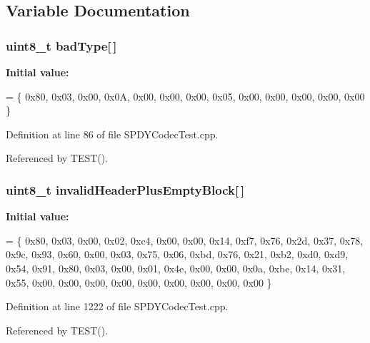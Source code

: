 \subsection{Variable Documentation}
\subsubsection[{bad\+Type}]{\setlength{\rightskip}{0pt plus 5cm}uint8\+\_\+t bad\+Type[$\,$]}\label{SPDYCodecTest_8cpp_aa822462decb359951f20089cbe97e732}
{\bfseries Initial value\+:}
\begin{DoxyCode}
=
\{ 0x80, 0x03, 0x00, 0x0A,
  0x00, 0x00, 0x00, 0x05,
  0x00, 0x00, 0x00, 0x00,
  0x00
\}
\end{DoxyCode}


Definition at line 86 of file S\+P\+D\+Y\+Codec\+Test.\+cpp.



Referenced by T\+E\+S\+T().

\subsubsection[{invalid\+Header\+Plus\+Empty\+Block}]{\setlength{\rightskip}{0pt plus 5cm}uint8\+\_\+t invalid\+Header\+Plus\+Empty\+Block[$\,$]}\label{SPDYCodecTest_8cpp_af46264bcbbc201f978f9dc76368eb01d}
{\bfseries Initial value\+:}
\begin{DoxyCode}
=
\{ 0x80, 0x03, 0x00, 0x02, 0xc4, 0x00, 0x00, 0x14,
  0xf7, 0x76, 0x2d, 0x37, 0x78, 0x9c, 0x93, 0x60,
  0x00, 0x03, 0x75, 0x06, 0xbd, 0x76, 0x21, 0xb2,
  0xd0, 0xd9, 0x54, 0x91, 0x80, 0x03, 0x00, 0x01,
  0x4e, 0x00, 0x00, 0x0a, 0xbe, 0x14, 0x31, 0x55,
  0x00, 0x00, 0x00, 0x00, 0x00, 0x00, 0x00, 0x00,
  0x00
\}
\end{DoxyCode}


Definition at line 1222 of file S\+P\+D\+Y\+Codec\+Test.\+cpp.



Referenced by T\+E\+S\+T().

